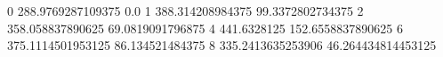 0 288.9769287109375 0.0
1 388.314208984375 99.3372802734375
2 358.058837890625 69.0819091796875
4 441.6328125 152.6558837890625
6 375.1114501953125 86.134521484375
8 335.2413635253906 46.264434814453125
